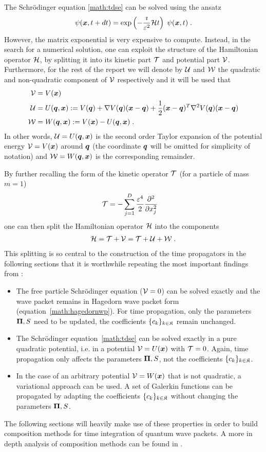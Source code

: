 \par\medskip
%
The Schrödinger equation \ref{math:tdse} can be solved using the ansatz
\begin{align}
	\psi (\bm{x},t+dt) = \exp \left( - \frac{\imath}{\varepsilon^2} \mathcal{H} t \right) \; \psi (\bm{x},t) \; .
\end{align}
%
However, the matrix exponential is very expensive to compute.
Instead, in the search for a numerical solution, one can exploit the structure of the Hamiltonian operator $\mathcal{H}$, by splitting it into its kinetic part $\mathcal{T}$ and potential part $\mathcal{V}$.
Furthermore, for the rest of the report we will denote by $\mathcal{U}$ and $\mathcal{W}$ the quadratic and non-quadratic component of $\mathcal{V}$ respectively and it will be used that
%
\begin{align}
	\mathcal{V} &= V(\bm{x}) \\ 
	\mathcal{U} &= U(\bm{q},\bm{x}) := V(\bm{q}) + \nabla V(\bm{q}) (\bm{x}-\bm{q})
	+ \frac{1}{2} (\bm{x}-\bm{q})^T \nabla^2 V(\bm{q}) (\bm{x}-\bm{q}) \\
	\mathcal{W} &= W(\bm{q},\bm{x}) := V(\bm{x}) - U(\bm{q},\bm{x}) \; .
\end{align}
%
In other words, $\mathcal{U} = U(\bm{q},\bm{x})$ is the second order Taylor expansion of the potential energy $\mathcal{V} = V(\bm{x})$ around $\bm{q}$ (the coordinate $\bm{q}$ will be omitted for simplicity of notation) and $\mathcal{W} = W(\bm{q},\bm{x})$ is the corresponding remainder.
\par\medskip
%
By further recalling the form of the kinetic operator $\mathcal{T}$ (for a particle of mass $m=1$)
\begin{align}
	\mathcal{T} &= - \sum_{j=1}^D \frac{\varepsilon^4}{2} \frac{\partial^2}{\partial x_j^2}
\end{align}
%
one can then split the Hamiltonian operator $\mathcal{H}$ into the components
%
\begin{align}
	\mathcal{H} = \mathcal{T} + \mathcal{V} = \mathcal{T} + \mathcal{U} + \mathcal{W} \; .
\end{align}
%
This splitting is so central to the construction of the time propagators in the following sections that it is worthwhile repeating the most important findings from \cite{FGL_semiclassical_dynamics}:
\begin{itemize}
	\item The free particle Schrödinger equation ($\mathcal{V}=0$) can be solved exactly and the wave packet remains in Hagedorn wave packet form (equation~\ref{math:hagedornwp}).
		For time propagation, only the parameters $\bm{\Pi},S$ need to be updated, the coefficients $\{c_k\}_{k \in \mathfrak{K}}$ remain unchanged.
	\item The Schrödinger equation~\ref{math:tdse} can be solved exactly in a pure quadratic potential, i.e. in a potential $\mathcal{V}=U(\bm{x})$ with $\mathcal{T}=0$.
		Again, time propagation only affects the parameters $\bm{\Pi},S$, not the coefficients $\{c_k\}_{k \in \mathfrak{K}}$.
	\item In the case of an arbitrary potential $\mathcal{V} = W(\bm{x})$ that is not quadratic, a variational approach can be used.
		A set of Galerkin functions can be propagated by adapting the coefficients $\{c_k\}_{k \in \mathfrak{K}}$ without changing the parameters $\bm{\Pi},S$.
\end{itemize}
%
The following sections will heavily make use of these properties in order to build composition methods for time integration of quantum wave packets.
A more in depth analysis of composition methods can be found in \cite{GeoNumInt}.
